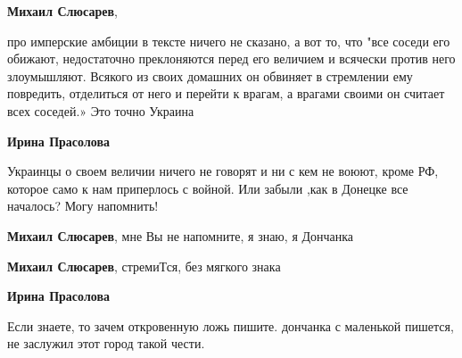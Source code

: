 \begin{itemize}
\begin{itemize}
\textbf{Михаил Слюсарев}, 

про имперские амбиции в тексте ничего не сказано, а вот то, что "все соседи его
обижают, недостаточно преклоняются перед его величием и всячески против него
злоумышляют. Всякого из своих домашних он обвиняет в стремлении ему повредить,
отделиться от него и перейти к врагам, а врагами своими он считает всех
соседей.» Это точно Украина

 
\textbf{Ирина Прасолова} 

Украинцы о своем величии ничего не говорят и ни с кем
не воюют, кроме РФ, которое само к нам приперлось с войной. Или забыли ,как в
Донецке все началось? Могу напомнить!


 
\textbf{Михаил Слюсарев}, мне Вы не напомните, я знаю, я Дончанка

 
\textbf{Михаил Слюсарев}, стремиТся, без мягкого знака

 
\textbf{Ирина Прасолова} 

Если знаете, то зачем откровенную ложь пишите. дончанка с маленькой пишется, не
заслужил этот город такой чести.

 

\end{itemize}
\end{itemize}
